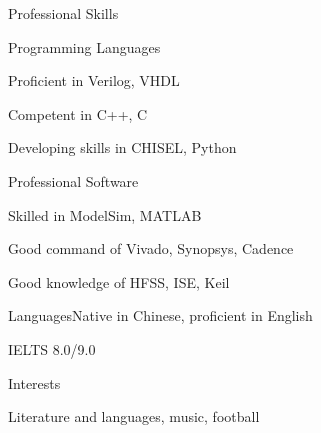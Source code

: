 \documentclass{resume} %
\begin{document}
\begin{rSection}{Professional Skills}
	
	\begin{rSubsection}{Programming Languages}{}{}{}
		\item Proficient in Verilog, VHDL
		\item Competent in C++, C
		\item Developing skills in CHISEL, Python
	\end{rSubsection}

	\begin{rSubsection}{Professional Software}{}{}{}
		\item Skilled in ModelSim, MATLAB 
		\item Good command of Vivado, Synopsys, Cadence
		\item Good knowledge of HFSS, ISE, Keil
	\end{rSubsection}

	\begin{rSubsection}{Languages}{}{Native in Chinese, proficient in English}{}
		\item IELTS 8.0/9.0
	\end{rSubsection}

\end{rSection}

\begin{rSection}{Interests}
	\item Literature and languages, music, football
\end{rSection}
\end{document}
